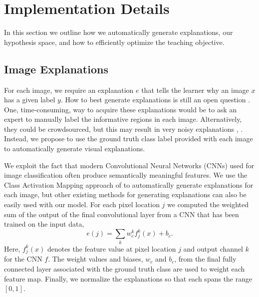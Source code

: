 \documentclass[../main.tex]{subfiles}
\begin{document}
\section{Implementation Details}
In this section we outline how we automatically generate explanations, our hypothesis space, and how to efficiently optimize the teaching objective.

%
%
%
\subsection{Image Explanations}
For each image, we require an explanation $e$ that tells the learner why an image $x$ has a given label $y$.
How to best generate explanations is still an open question \cite{DoshiKim2017Interpretability}.
One, time-consuming, way to acquire these explanations would be to ask an expert to manually label the informative regions in each image. 
Alternatively, they could be crowdsourced, but this may result in very noisy explanations \eg, \cite{deng2016}.
Instead, we propose to use the ground truth class label provided with each image to automatically generate visual explanations. 

We exploit the fact that modern Convolutional Neural Networks (CNNs) used for image classification often produce semantically meaningful features.   
We use the Class Activation Mapping approach of \cite{zhou2016learning} to automatically generate explanations for each image, but other existing methods for generating explanations can also be easily used with our model.
For each pixel location $j$ we computed the weighted sum of the output of the final convolutional layer from a CNN that has been trained on the input data,
\begin{equation}
 e(j) = \sum_k w_c^k f^k_{j}(x) + b_c.
\end{equation}
Here, $f^k_{j}(x)$ denotes the feature value at pixel location $j$ and output channel $k$ for the CNN $f$.
The weight values and biases, $w_c$ and $b_c$, from the final fully connected layer associated with the ground truth class are used to weight each feature map. 
Finally, we normalize the explanations so that each spans the range $[0, 1]$.
\end{document}
